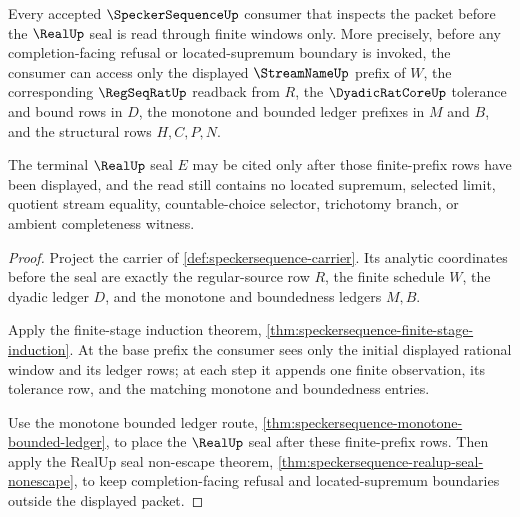 \begin{theorem}
\label{thm:regular-real-tail-selector-induction-window}
Every accepted $\SpeckerSequenceUp$ consumer that inspects the packet before the $\RealUp$ seal is read through finite windows only. More precisely, before any completion-facing refusal or located-supremum boundary is invoked, the consumer can access only the displayed $\StreamNameUp$ prefix of $W$, the corresponding $\RegSeqRatUp$ readback from $R$, the $\DyadicRatCoreUp$ tolerance and bound rows in $D$, the monotone and bounded ledger prefixes in $M$ and $B$, and the structural rows $H,C,P,N$.

The terminal $\RealUp$ seal $E$ may be cited only after those finite-prefix rows have been displayed, and the read still contains no located supremum, selected limit, quotient stream equality, countable-choice selector, trichotomy branch, or ambient completeness witness.
\end{theorem}
\begin{proof}
Project the carrier of \autoref{def:speckersequence-carrier}. Its analytic coordinates before the seal are exactly the regular-source row $R$, the finite schedule $W$, the dyadic ledger $D$, and the monotone and boundedness ledgers $M,B$.

Apply the finite-stage induction theorem, \autoref{thm:speckersequence-finite-stage-induction}. At the base prefix the consumer sees only the initial displayed rational window and its ledger rows; at each step it appends one finite observation, its tolerance row, and the matching monotone and boundedness entries.

Use the monotone bounded ledger route, \autoref{thm:speckersequence-monotone-bounded-ledger}, to place the $\RealUp$ seal after these finite-prefix rows. Then apply the RealUp seal non-escape theorem, \autoref{thm:speckersequence-realup-seal-nonescape}, to keep completion-facing refusal and located-supremum boundaries outside the displayed packet.
\end{proof}

